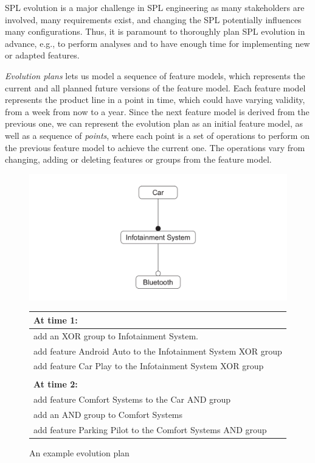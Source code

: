 \documentclass[a4paper,english]{ifimaster}
\begin{document}
SPL evolution is a major challenge in SPL engineering as many stakeholders are involved, many requirements exist, and changing the SPL potentially influences many configurations. Thus, it is paramount to thoroughly plan SPL evolution in advance, e.g., to perform analyses and to have enough time for implementing new or adapted features.

\textit{Evolution plans} lets us model a sequence of feature models, which represents the current and all planned future versions of the feature model. Each feature model represents the product line in a point in time, which could have varying validity, from a week from now to a year. Since the next feature model is derived from the previous one, we can represent the evolution plan as an initial feature model, as well as a sequence of \textit{points}, where each point is a set of operations to perform on the previous feature model to achieve the current one. The operations vary from changing, adding or deleting features or groups from the feature model.

\begin{figure}[htpb]
	\centering
	\includegraphics[width=0.8\linewidth]{illustrations/initial.pdf}
	\begin{tabular}{l}
		\textbf{At time 1:}                                           \\ \hline
		add an XOR group to Infotainment System.                      \\
		add feature Android Auto to the Infotainment System XOR group \\
		add feature Car Play to the Infotainment System XOR group     \\
		\\
		\textbf{At time 2:}                                           \\ \hline
		add feature Comfort Systems to the Car AND group              \\
		add an AND group to Comfort Systems                           \\
		add feature Parking Pilot to the Comfort Systems AND group
	\end{tabular}
	\caption{An example evolution plan}%
	\label{fig:exampleplan}
\end{figure}
\end{document}
